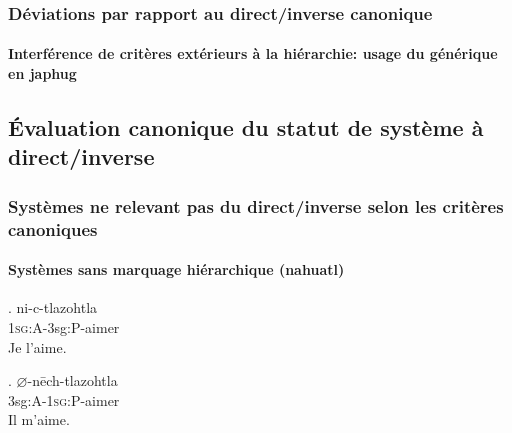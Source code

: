 \begin{frame}
\frametitle{Déviations par rapport au direct/inverse canonique}
\framesubtitle{Interférence de critères extérieurs à la hiérarchie: usage
  du générique en japhug}
\end{frame}

\subsection[Évaluation du direct/inverse]{Évaluation canonique du statut de système à direct/inverse}
\begin{frame}
\frametitle{Systèmes ne relevant pas du direct/inverse selon les
  critères canoniques}
\framesubtitle{Systèmes sans marquage hiérarchique (nahuatl)}

\NoAutoSpaceBeforeFDP

\ex. ni-c-tlazohtla \\
1\textsc{sg}:A-3sg:P-aimer \\
Je l'aime.


\ex. $\varnothing$-n\=ech-tlazohtla \\
3sg:A-1\textsc{sg}:P-aimer \\
Il m'aime.

\AutoSpaceBeforeFDP

\end{frame}




